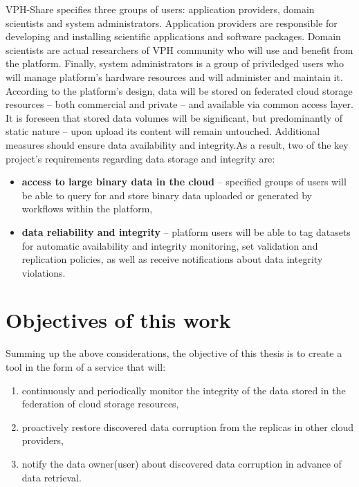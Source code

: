 VPH-Share specifies three groups of users:
application providers, domain scientists and system administrators. Application providers
are responsible for developing and installing scientific applications and software packages.
Domain scientists are actual researchers of VPH community who will use and benefit from 
the platform. Finally, system administrators is a group of priviledged users who will
manage platform's hardware resources and will administer and maintain it.\\

According to the platform's design, data will be stored on federated cloud storage resources --
both commercial and private -- and available via common access layer. It is foreseen that stored
data volumes will be significant, but predominantly of static nature -- upon upload its content will
remain untouched. Additional measures should ensure data availability and integrity.As a result, two
of the key project's requirements regarding data storage and integrity are:

\begin{itemize}
\item \textbf{access to large binary data in the cloud} -- specified groups of users will
be able to query for and store binary data uploaded or generated by workflows within the platform, 
\item \textbf{data reliability and integrity} -- platform users will be able to tag datasets
for automatic availability and integrity monitoring, set validation and replication policies,
as well as receive notifications about data integrity violations.
\end{itemize}




\section{Objectives of this work}

Summing up the above considerations, the objective of this thesis is to create a tool
in the form of a service that will:

\begin{enumerate}
\item continuously and periodically monitor the integrity of the data stored in the
federation of cloud storage resources,
\item proactively restore discovered data corruption from the replicas in other cloud
providers,
\item notify the data owner(user) about discovered data corruption in advance of data retrieval. 
\end{enumerate}

